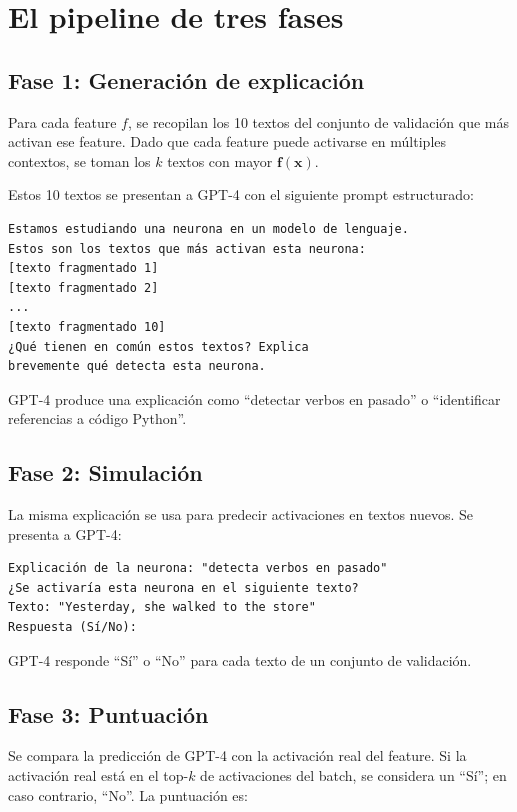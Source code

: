 \documentclass[11pt,a4paper]{report}
\theoremstyle{definition}
\begin{document}
\section{El pipeline de tres fases}

\subsection{Fase 1: Generación de explicación}

Para cada feature $f$, se recopilan los 10 textos del conjunto de validación que más activan ese feature. Dado que cada feature puede activarse en múltiples contextos, se toman los $k$ textos con mayor $\mathbf{f}(\mathbf{x})$.

Estos 10 textos se presentan a GPT-4 con el siguiente prompt estructurado:

\begin{lstlisting}
Estamos estudiando una neurona en un modelo de lenguaje.
Estos son los textos que más activan esta neurona:
[texto fragmentado 1]
[texto fragmentado 2]
...
[texto fragmentado 10]
¿Qué tienen en común estos textos? Explica
brevemente qué detecta esta neurona.
\end{lstlisting}

GPT-4 produce una explicación como ``detectar verbos en pasado'' o ``identificar referencias a código Python''.

\subsection{Fase 2: Simulación}

La misma explicación se usa para predecir activaciones en textos nuevos. Se presenta a GPT-4:

\begin{lstlisting}
Explicación de la neurona: "detecta verbos en pasado"
¿Se activaría esta neurona en el siguiente texto?
Texto: "Yesterday, she walked to the store"
Respuesta (Sí/No):
\end{lstlisting}

GPT-4 responde ``Sí'' o ``No'' para cada texto de un conjunto de validación.

\subsection{Fase 3: Puntuación}

Se compara la predicción de GPT-4 con la activación real del feature. Si la activación real está en el top-$k$ de activaciones del batch, se considera un ``Sí''; en caso contrario, ``No''. La puntuación es:
\end{document}
